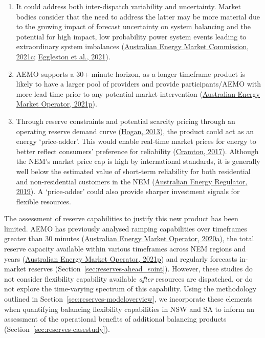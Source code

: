 \documentclass[12pt,a4paper,]{report}
\providecommand{\tightlist}{%
  \setlength{\itemsep}{0pt}\setlength{\parskip}{0pt}}
\begin{document}
\begin{enumerate}
\def\labelenumi{\arabic{enumi}.}
\tightlist
\item
  It could address both inter-dispatch variability and uncertainty.
  Market bodies consider that the need to address the latter may be more
  material due to the growing impact of forecast uncertainty on system
  balancing and the potential for high impact, low probability power
  system events leading to extraordinary system imbalances
  (\protect\hyperlink{ref-australianenergymarketcommissionReserveServicesNational2021}{Australian
  Energy Market Commission, 2021c};
  \protect\hyperlink{ref-egglestonSecurityResilienceTechnical2021}{Eggleston
  et al., 2021}).
\item
  AEMO supports a 30+ minute horizon, as a longer timeframe product is
  likely to have a larger pool of providers and provide
  participants/AEMO with more lead time prior to any potential market
  intervention
  (\protect\hyperlink{ref-australianenergymarketoperatorSubmissionAEMCDirections2021}{Australian
  Energy Market Operator, 2021p}).
\item
  Through reserve constraints and potential scarcity pricing through an
  operating reserve demand curve
  (\protect\hyperlink{ref-hoganElectricityScarcityPricing2013}{Hogan,
  2013}), the product could act as an energy `price-adder'. This would
  enable real-time market prices for energy to better reflect consumers'
  preference for reliability
  (\protect\hyperlink{ref-cramtonElectricityMarketDesign2017}{Cramton,
  2017}). Although the NEM's market price cap is high by international
  standards, it is generally well below the estimated value of
  short-term reliability for both residential and non-residential
  customers in the NEM
  (\protect\hyperlink{ref-australianenergyregulatorValuesCustomerReliability2019}{Australian
  Energy Regulator, 2019}). A `price-adder' could also provide sharper
  investment signals for flexible resources.
\end{enumerate}

The assessment of reserve capabilities to justify this new product has
been limited. AEMO has previously analysed ramping capabilities over
timeframes greater than 30 minutes
(\protect\hyperlink{ref-australianenergymarketoperatorRenewableIntegrationStudy2020}{Australian
Energy Market Operator, 2020a}), the total reserve capacity available
within various timeframes across NEM regions and years
(\protect\hyperlink{ref-australianenergymarketoperatorSubmissionAEMCDirections2021}{Australian
Energy Market Operator, 2021p}) and regularly forecasts in-market
reserves (Section~\ref{sec:reserves-ahead_soint}). However, these
studies do not consider flexibility capability available \emph{after}
resources are dispatched, or do not explore the time-varying spectrum of
this capability. Using the methodology outlined in
Section~\ref{sec:reserves-modeloverview}, we incorporate these elements
when quantifying balancing flexibility capabilities in NSW and SA to
inform an assessment of the operational benefits of additional balancing
products (Section~\ref{sec:reserves-casestudy}).
\end{document}
